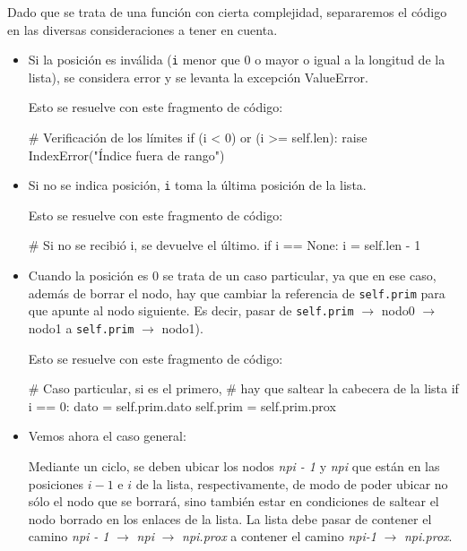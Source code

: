 Dado que se trata de una función con cierta complejidad, separaremos el
código en las diversas consideraciones a tener en cuenta.

\begin{itemize}

\item Si la posición es inválida (\lstinline!i! menor que $0$ o mayor o
igual a la longitud de la lista), se considera error y se levanta la
excepción ValueError.

Esto se resuelve con este fragmento de código:

\begin{codigo-python-sn}
        # Verificación de los límites
        if (i < 0) or (i >= self.len):
            raise IndexError("Índice fuera de rango")
\end{codigo-python-sn}

\item Si no se indica posición, \lstinline!i! toma la última posición de la lista.

Esto se resuelve con este fragmento de código:
\begin{codigo-python-sn}
        # Si no se recibió i, se devuelve el último.
        if i == None:
            i = self.len - 1
\end{codigo-python-sn}

\item Cuando la posición es $0$ se trata de un caso particular, ya que en ese
caso, además de borrar el nodo, hay que cambiar la referencia de
\lstinline!self.prim! para que apunte al nodo siguiente.  Es decir, pasar de
\lstinline!self.prim! $\rightarrow$ nodo0 $\rightarrow$ nodo1 a
\lstinline!self.prim! $\rightarrow$ nodo1).

Esto se resuelve con este fragmento de código:

\begin{codigo-python-sn}
        # Caso particular, si es el primero,
        # hay que saltear la cabecera de la lista
        if i == 0:
            dato = self.prim.dato
            self.prim = self.prim.prox
\end{codigo-python-sn}

\item Vemos ahora el caso general:

Mediante un ciclo, se deben ubicar los nodos {\it npi - 1} y {\it npi} que
están en las posiciones $i-1$ e $i$ de la lista, respectivamente, de modo de
poder ubicar no sólo el nodo que se borrará, sino también estar en condiciones
de saltear el nodo borrado en los enlaces de la lista.  La lista debe pasar de
contener el camino {\it npi - 1} $\rightarrow$ {\it npi} $\rightarrow$ {\it
npi.prox} a contener el camino {\it npi-1} $\rightarrow$ {\it npi.prox}.


\end{itemize}
